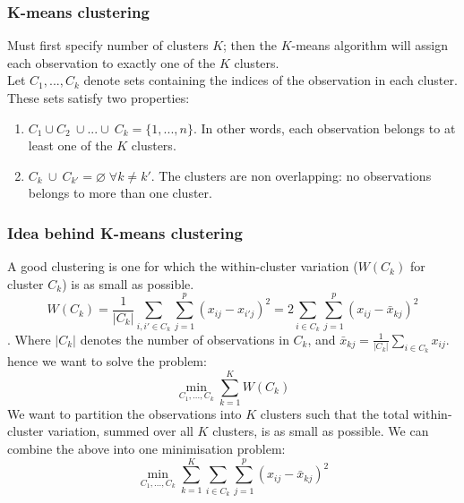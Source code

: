 \documentclass[11pt]{article}
\begin{document}
\subsubsection{K-means clustering}
\noindent Must first specify number of clusters $K$; then the $K$-means algorithm will assign each observation to exactly one of the $K$ clusters. \\

\noindent Let $C_1,...,C_k$ denote sets containing the indices of the observation in each cluster. These sets satisfy two properties:
\begin{enumerate}
    \item $C_1 \cup C_2 \ \cup ... \cup \ C_k = \{1,...,n\}$. In other words, each observation belongs to at least one of the $K$ clusters.
    \item $C_k \ \cup \ C_{k'} = \varnothing \; \forall k\neq k'$. The clusters are non overlapping: no observations belongs to more than one cluster.
\end{enumerate}

\subsubsection*{Idea behind K-means clustering}
\noindent A good clustering is one for which the within-cluster variation ($W(C_k)$ for cluster $C_k$) is as small as possible.
$$W(C_k) = \frac{1}{|C_k|}\sum_{i,i'\in C_k}\sum_{j=1}^{p}(x_{ij} - x_{i'j})^2 = 2\sum_{i \in C_k}\sum_{j=1}^{p}(x_{ij} - \bar{x}_{kj})^2$$.
\noindent Where $|C_k|$ denotes the number of observations in $C_k$, and $\bar{x}_{kj} = \frac{1}{|C_k|}\sum_{i \in C_k}{x_{ij}}$. \\

\noindent hence we want to solve the problem:
$$\min_{C_1,...,C_k}{\sum_{k=1}^{K}{W(C_k)}}$$
\noindent We want to partition the observations into $K$ clusters such that the total within-cluster variation, summed over all $K$ clusters, is as small as possible.  We can combine the above into one minimisation problem:
$$\min_{C_1,...,C_k}\sum_{k=1}^{K}\sum_{i \in C_k}\sum_{j=1}^{p}{(x_{ij} - \bar{x}_{kj})^2}$$
\end{document}
